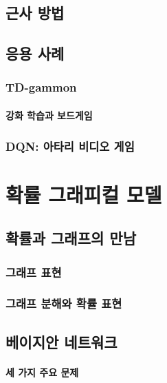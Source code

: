 \documentclass [12pt] {oblivoir}
\let\oldsubsubsection=\subsubsection
\renewcommand{\subsubsection}
{
  \filbreak
  \oldsubsubsection
}
\begin{document}
\subsection{근사 방법}

\subsection{응용 사례}

\subsubsection{TD-gammon}

\paragraph*{강화 학습과 보드게임}\mbox{}

\vspace{3mm}

\subsubsection{DQN: 아타리 비디오 게임}

\newpage
\section{확률 그래피컬 모델}

\subsection{확률과 그래프의 만남}

\subsubsection{그래프 표현}

\subsubsection{그래프 분해와 확률 표현}

\subsection{베이지안 네트워크}

\paragraph*{세 가지 주요 문제}\mbox{}
\end{document}
